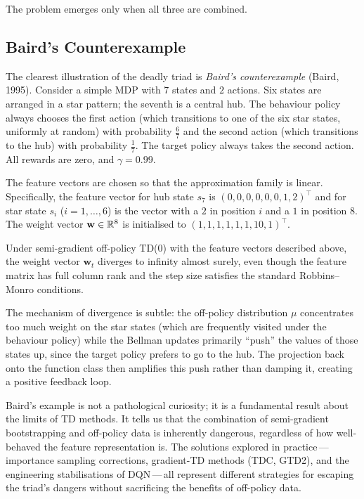 The problem emerges only when all three are combined.

\subsection{Baird's Counterexample}
\label{subsec:baird}

The clearest illustration of the deadly triad is \emph{Baird's counterexample}
(Baird, 1995).  Consider a simple MDP with $7$ states and $2$ actions.  Six states are arranged in
a star pattern; the seventh is a central hub.  The behaviour policy always chooses the first action
(which transitions to one of the six star states, uniformly at random) with probability $\frac{6}{7}$
and the second action (which transitions to the hub) with probability $\frac{1}{7}$.
The target policy always takes the second action.  All rewards are zero, and $\gamma = 0.99$.

The feature vectors are chosen so that the approximation family is linear.  Specifically, the
feature vector for hub state $s_7$ is $(0,0,0,0,0,0,1,2)^\top$ and for star state $s_i$
($i = 1, \ldots, 6$) is the vector with a $2$ in position $i$ and a $1$ in position $8$.  The
weight vector $\mathbf{w} \in \mathbb{R}^8$ is initialised to $(1,1,1,1,1,1,10,1)^\top$.

\begin{theorem}
\label{thm:baird}
Under semi-gradient off-policy TD(0) with the feature vectors described above, the weight vector
$\mathbf{w}_t$ diverges to infinity almost surely, even though the feature matrix has full column
rank and the step size satisfies the standard Robbins--Monro conditions.
\end{theorem}

The mechanism of divergence is subtle: the off-policy distribution $\mu$ concentrates too much
weight on the star states (which are frequently visited under the behaviour policy) while the
Bellman updates primarily ``push'' the values of those states up, since the target policy prefers
to go to the hub.  The projection back onto the function class then amplifies this push rather
than damping it, creating a positive feedback loop.

\begin{remark}
\label{rem:baird-lesson}
Baird's example is not a pathological curiosity; it is a fundamental result about the limits of
TD methods.  It tells us that the combination of semi-gradient bootstrapping and off-policy data
is inherently dangerous, regardless of how well-behaved the feature representation is.  The
solutions explored in practice\,---\,importance sampling corrections, gradient-TD methods
(TDC, GTD2), and the engineering stabilisations of DQN\,---\,all represent different strategies
for escaping the triad's dangers without sacrificing the benefits of off-policy data.
\end{remark}


